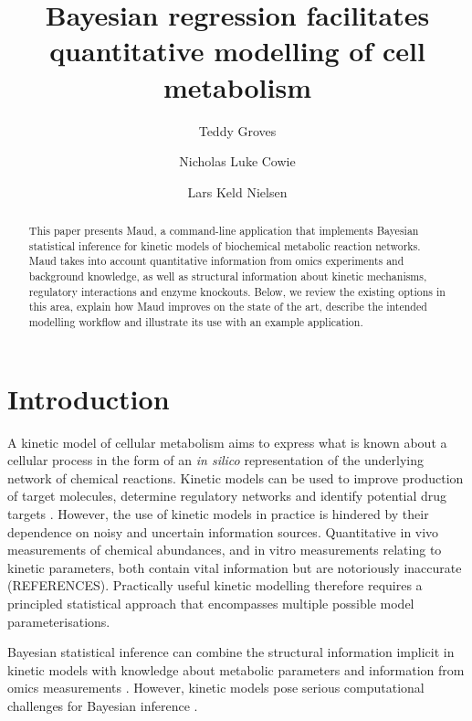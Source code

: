 \documentclass[journal=asbcd6,manuscript=article,layout=traditional]{achemso}
\author{Teddy Groves}
\affiliation{DTU Biosustain, DTU, Kongens Lyngby, Denmark}
\author{Nicholas Luke Cowie}
\affiliation{DTU Biosustain, DTU, Kongens Lyngby, Denmark}
\author{Lars Keld Nielsen}
\affiliation{DTU Biosustain, DTU, Kongens Lyngby, Denmark}
\affiliation{   }
\title[]{Bayesian regression facilitates quantitative modelling of cell
metabolism}
\begin{document}
\maketitle
\begin{abstract}
This paper presents Maud, a command-line application that implements
Bayesian statistical inference for kinetic models of biochemical
metabolic reaction networks. Maud takes into account quantitative
information from omics experiments and background knowledge, as well as
structural information about kinetic mechanisms, regulatory interactions
and enzyme knockouts. Below, we review the existing options in this
area, explain how Maud improves on the state of the art, describe the
intended modelling workflow and illustrate its use with an example
application.
\end{abstract}
\ifdefined\Shaded\renewenvironment{Shaded}{\begin{tcolorbox}[sharp corners, breakable, enhanced, boxrule=0pt, interior hidden, frame hidden, borderline west={3pt}{0pt}{shadecolor}]}{\end{tcolorbox}}\fi

\hypertarget{introduction}{%
\section{Introduction}\label{introduction}}

A kinetic model of cellular metabolism aims to express what is known
about a cellular process in the form of an \emph{in silico}
representation of the underlying network of chemical reactions. Kinetic
models can be used to improve production of target molecules, determine
regulatory networks \citep{christodoulou_reserve_2018} and identify
potential drug targets
\citep{deberardinis_fundamentals_2016, Liberti2017}. However, the use of
kinetic models in practice is hindered by their dependence on noisy and
uncertain information sources. Quantitative in vivo measurements of
chemical abundances, and in vitro measurements relating to kinetic
parameters, both contain vital information but are notoriously
inaccurate (REFERENCES). Practically useful kinetic modelling therefore
requires a principled statistical approach that encompasses multiple
possible model parameterisations.

Bayesian statistical inference can combine the structural information
implicit in kinetic models with knowledge about metabolic parameters and
information from omics measurements
\citep{saa_construction_2016, gopalakrishnan_k-fit_2020}. However,
kinetic models pose serious computational challenges for Bayesian
inference \citep{gutenkunst_2007, raue_identifiability_2010}.
\end{document}
